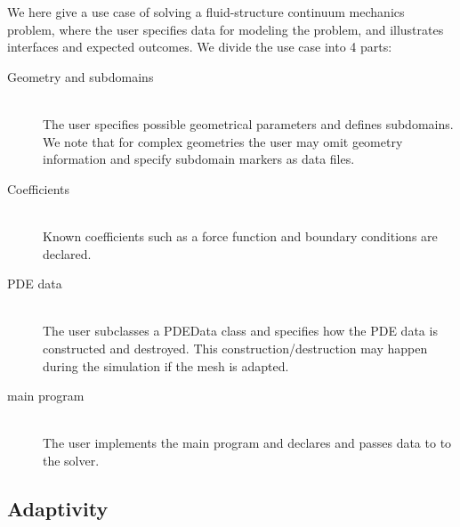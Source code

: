 We here give a use case of solving a fluid-structure continuum
mechanics problem, where the user specifies data for modeling the
problem, and illustrates interfaces and expected outcomes. We divide
the use case into 4 parts:

\begin{description}
\item[Geometry and subdomains]
\ \\
The user specifies possible geometrical parameters and defines
subdomains. We note that for complex geometries the user may omit
geometry information and specify subdomain markers as data files.
\item[Coefficients]
\ \\
Known coefficients such as a force function and boundary conditions
are declared.
\item[PDE data]
\ \\
The user subclasses a PDEData class and specifies how the PDE data is
constructed and destroyed. This construction/destruction may happen
during the simulation if the mesh is adapted.
\item[main program]
\ \\
The user implements the main program and declares and passes data to
to the solver.
\end{description}

\subsection{Adaptivity}

